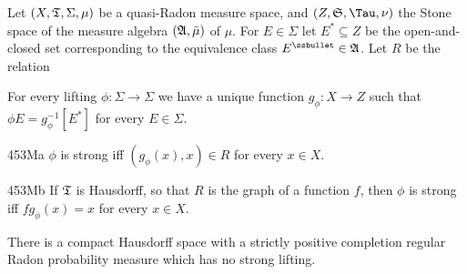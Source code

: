  Let  
$(X,\frak T,\Sigma,\mu)$ be a quasi-Radon measure space, and  
$(Z,\frak S,\Tau,\nu)$ the Stone space of the measure algebra  
$(\frak A,\bar\mu)$ 
of $\mu$.   For $E\in\Sigma$ let $E^*\subseteq Z$ be the open-and-closed 
set corresponding to the equivalence class $E^{\ssbullet}\in\frak A$. 
Let $R$ be the relation 
      
      
\noindent{}For every lifting $\phi:\Sigma\to\Sigma$ we 
have a unique function $g_{\phi}:X\to Z$ such that 
$\phi E=g_{\phi}^{-1}[E^*]$ for every $E\in\Sigma$. 
      
\spheader 453Ma $\phi$ is strong iff $(g_{\phi}(x),x)\in R$ for every 
$x\in X$.   %
      
\spheader 453Mb If $\frak T$ is Hausdorff, so that $R$ is the graph of a 
function $f$, then $\phi$ is strong iff 
$fg_{\phi}(x)=x$ for every $x\in X$.    
      
 There is a 
compact Hausdorff space with a strictly positive 
completion regular Radon probability measure which has no strong 
lifting. 
      
